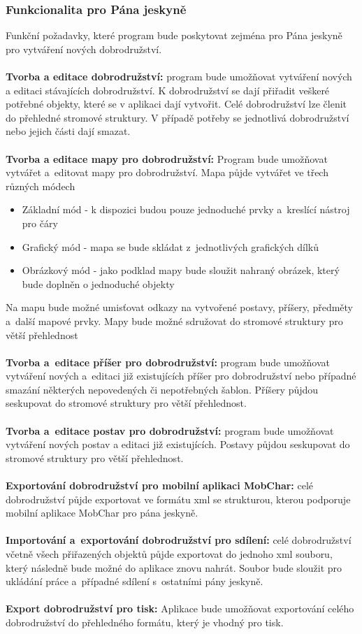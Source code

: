 \documentclass[thesis=B,czech]{resources/FITthesis}[2012/06/26]
\begin{document}
\subsubsection{Funkcionalita pro Pána jeskyně}
Funkční požadavky, které program bude poskytovat zejména pro Pána jeskyně pro vytváření nových dobrodružství.\\
\\
\textbf{Tvorba a editace dobrodružství:} program bude umožňovat vytváření nových a editaci stávajících dobrodružství. K dobrodružství se dají přiřadit veškeré potřebné objekty, které se v aplikaci dají vytvořit. Celé dobrodružství lze členit do přehledné stromové struktury. V případě potřeby se jednotlivá dobrodružství nebo jejich části dají smazat.\\
\\
\textbf{Tvorba a editace mapy pro dobrodružství:} Program bude umožňovat vytvářet a~editovat mapy pro dobrodružství. Mapa půjde vytvářet ve třech různých módech
\begin{itemize}
\item Základní mód - k dispozici budou pouze jednoduché prvky a~kreslící nástroj pro čáry
\item Grafický mód - mapa se bude skládat z~jednotlivých grafických dílků
\item Obrázkový mód - jako podklad mapy bude sloužit nahraný obrázek, který bude doplněn o jednoduché objekty
\end{itemize}
Na mapu bude možné umisťovat odkazy na vytvořené postavy, příšery, předměty a~další mapové prvky. Mapy bude možné sdružovat do stromové struktury pro větší přehlednost\\
\\
\textbf{Tvorba a~editace příšer pro dobrodružství:} program bude umožňovat vytváření nových a~editaci již existujících příšer pro dobrodružství nebo případné smazání některých nepovedených či nepotřebných šablon. Příšery půjdou seskupovat do stromové struktury pro větší přehlednost.\\
\\
\textbf{Tvorba a~editace postav pro dobrodružství:} program bude umožňovat vytváření nových postav a editaci již existujících. Postavy půjdou seskupovat do stromové struktury pro větší přehlednost.\\
\\
\textbf{Exportování dobrodružství pro mobilní aplikaci MobChar:} celé dobrodružství půjde exportovat ve formátu xml se strukturou, kterou podporuje mobilní aplikace MobChar pro pána jeskyně.\\
\\
\textbf{Importování a~exportování dobrodružství pro sdílení:} celé dobrodružství včetně všech přiřazených objektů půjde exportovat do jednoho xml souboru, který následně bude možné do aplikace znovu nahrát. Soubor bude sloužit pro ukládání práce a~případné sdílení s~ostatními pány jeskyně.\\
\\
\textbf{Export dobrodružství pro tisk:} Aplikace bude umožňovat exportování celého dobrodružství do přehledného formátu, který je vhodný pro tisk. 
\end{document}
